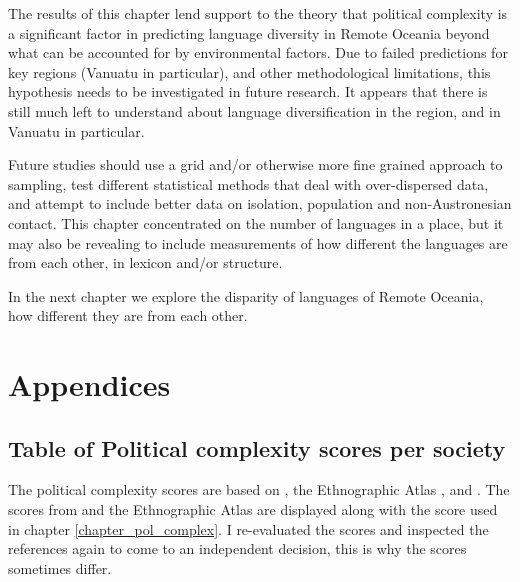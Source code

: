 \documentclass[a4paper,10pt]{article} %
\begin{document}
The results of this chapter lend support to the theory that political complexity is a significant factor in predicting language diversity in Remote Oceania beyond what can be accounted for by environmental factors. Due to failed predictions for key regions (Vanuatu in particular), and other methodological limitations, this hypothesis needs to be investigated in future research. It appears that there is still much left to understand about language diversification in the region, and in Vanuatu in particular.

Future studies should use a grid and/or otherwise more fine grained approach to sampling, test different statistical methods that deal with over-dispersed data, and attempt to include better data on isolation, population and non-Austronesian contact. This chapter concentrated on the number of languages in a place, but it may also be revealing to include measurements of how different the languages are from each other, in lexicon and/or structure.

In the next chapter we explore the disparity of languages of Remote Oceania, how different they are from each other.



\newpage



\newpage
\singlespacing




\newpage
\singlespacing
\appendix
\section*{Appendices}
\renewcommand{\thesubsection}{\Alph{subsection}}



\subsection{Table of Political complexity scores per society}
\label{Pol_complex_table}
\singlespacing
The political complexity scores are based on \cite{sheehan2018coevolution}, the Ethnographic Atlas  \citep{d_place_all},\citet{bonnemaison1972systeme} and \cite{bonnemaison1996graded}. The scores from  \cite{sheehan2018coevolution} and the Ethnographic Atlas are displayed along with the score used in chapter \ref{chapter_pol_complex}. I re-evaluated the scores and inspected the references again to come to an independent decision, this is why the scores sometimes differ.
\end{document}
